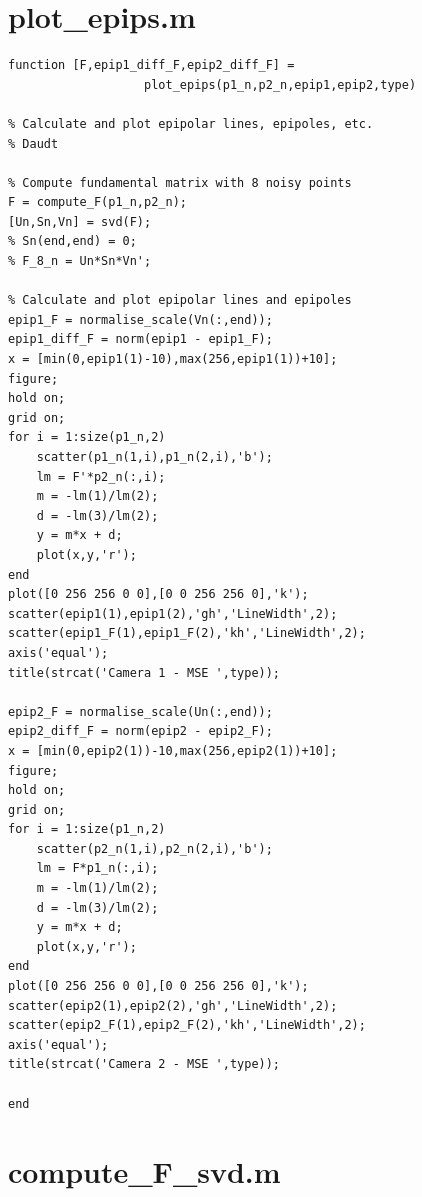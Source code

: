 \documentclass[peerreview,11pt]{IEEEtran}
\begin{document}
\newpage
\section{plot\_epips.m}\label{plotepips}

\begin{verbatim}
function [F,epip1_diff_F,epip2_diff_F] = 
                   plot_epips(p1_n,p2_n,epip1,epip2,type)
                   
% Calculate and plot epipolar lines, epipoles, etc.
% Daudt

% Compute fundamental matrix with 8 noisy points
F = compute_F(p1_n,p2_n);
[Un,Sn,Vn] = svd(F);
% Sn(end,end) = 0;
% F_8_n = Un*Sn*Vn';

% Calculate and plot epipolar lines and epipoles
epip1_F = normalise_scale(Vn(:,end));
epip1_diff_F = norm(epip1 - epip1_F);
x = [min(0,epip1(1)-10),max(256,epip1(1))+10];
figure;
hold on;
grid on;
for i = 1:size(p1_n,2)
    scatter(p1_n(1,i),p1_n(2,i),'b');
    lm = F'*p2_n(:,i);
    m = -lm(1)/lm(2);
    d = -lm(3)/lm(2);
    y = m*x + d;
    plot(x,y,'r');
end
plot([0 256 256 0 0],[0 0 256 256 0],'k');
scatter(epip1(1),epip1(2),'gh','LineWidth',2);
scatter(epip1_F(1),epip1_F(2),'kh','LineWidth',2);
axis('equal');
title(strcat('Camera 1 - MSE ',type));

epip2_F = normalise_scale(Un(:,end));
epip2_diff_F = norm(epip2 - epip2_F);
x = [min(0,epip2(1))-10,max(256,epip2(1))+10];
figure;
hold on;
grid on;
for i = 1:size(p1_n,2)
    scatter(p2_n(1,i),p2_n(2,i),'b');
    lm = F*p1_n(:,i);
    m = -lm(1)/lm(2);
    d = -lm(3)/lm(2);
    y = m*x + d;
    plot(x,y,'r');
end
plot([0 256 256 0 0],[0 0 256 256 0],'k');
scatter(epip2(1),epip2(2),'gh','LineWidth',2);
scatter(epip2_F(1),epip2_F(2),'kh','LineWidth',2);
axis('equal');
title(strcat('Camera 2 - MSE ',type));

end
\end{verbatim}


\newpage
\section{compute\_F\_svd.m}\label{fsvd}
\end{document}
